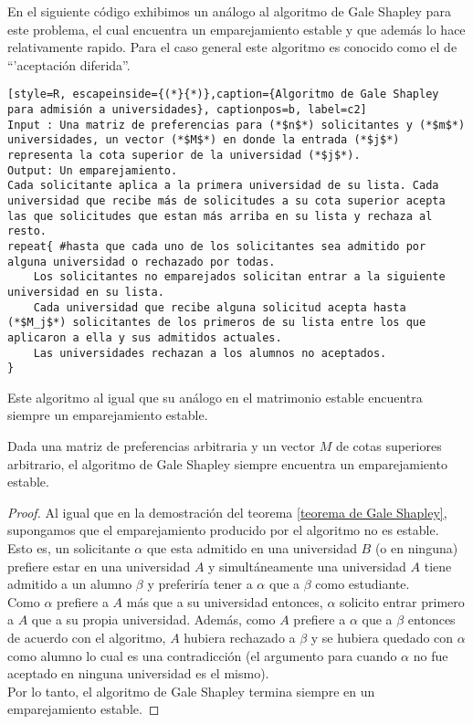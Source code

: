 En el siguiente código exhibimos un análogo al algoritmo de Gale Shapley para este problema, el cual encuentra un emparejamiento estable y que además lo hace relativamente rapido. Para el caso general este algoritmo es conocido como el de ``'aceptación diferida''.
\pagebreak
\begin{lstlisting}[style=R, escapeinside={(*}{*)},caption={Algoritmo de Gale Shapley para admisión a universidades}, captionpos=b, label=c2]
Input : Una matriz de preferencias para (*$n$*) solicitantes y (*$m$*) universidades, un vector (*$M$*) en donde la entrada (*$j$*) representa la cota superior de la universidad (*$j$*).
Output: Un emparejamiento. 
Cada solicitante aplica a la primera universidad de su lista. Cada universidad que recibe más de solicitudes a su cota superior acepta las que solicitudes que estan más arriba en su lista y rechaza al resto. 
repeat{ #hasta que cada uno de los solicitantes sea admitido por alguna universidad o rechazado por todas.
	Los solicitantes no emparejados solicitan entrar a la siguiente universidad en su lista. 
	Cada universidad que recibe alguna solicitud acepta hasta (*$M_j$*) solicitantes de los primeros de su lista entre los que aplicaron a ella y sus admitidos actuales.
	Las universidades rechazan a los alumnos no aceptados.
}
\end{lstlisting}

Este algoritmo al igual que su análogo en el matrimonio estable encuentra siempre un emparejamiento estable.
\begin{cor}
Dada una matriz de preferencias arbitraria y un vector $M$ de cotas superiores arbitrario, el algoritmo de Gale Shapley siempre encuentra un emparejamiento estable.
\end{cor}
\begin{proof}
Al igual que en la demostración del teorema \ref{teorema de Gale Shapley}, supongamos que el emparejamiento producido por el algoritmo no es estable. 
Esto es, un solicitante $\alpha$ que esta admitido en una universidad $B$ (o en ninguna) prefiere estar en una universidad $A$ y simultáneamente una universidad $A$ tiene admitido a un alumno $\beta$ y preferiría tener a $\alpha$ que a $\beta$ como estudiante. \\
Como $\alpha$ prefiere a $A$ más que a su universidad entonces, $\alpha$ solicito entrar primero a $A$ que a su propia universidad. 
Además, como $A$ prefiere a $\alpha$ que a $\beta$ entonces de acuerdo con el algoritmo, $A$ hubiera rechazado a $\beta$ y se hubiera quedado con $\alpha$ como alumno lo cual es una contradicción (el argumento para cuando $\alpha$ no fue aceptado en ninguna universidad es el mismo). \\
Por lo tanto, el algoritmo de Gale Shapley termina siempre en un emparejamiento estable. 
\end{proof}

